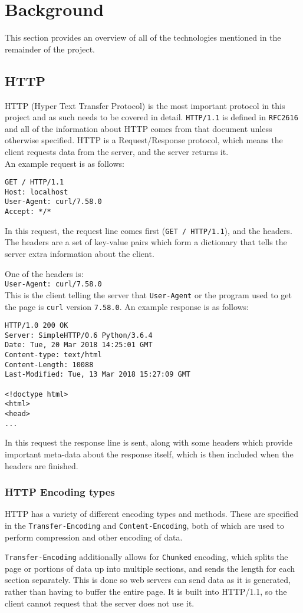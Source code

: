 \section{Background}
This section provides an overview of all of the technologies mentioned in the remainder of the project.
\subsection{HTTP}
HTTP (Hyper Text Transfer Protocol) is the most important protocol in this project and as such needs to be covered in detail.
\texttt{HTTP/1.1} is defined in \texttt{RFC2616}\cite{rfc2616} and all of the information about HTTP comes from that document unless otherwise specified.
HTTP is a Request/Response protocol, which means the client requests data from the server, and the server returns it.\\
An example request is as follows:
\begin{verbatim}
GET / HTTP/1.1
Host: localhost
User-Agent: curl/7.58.0
Accept: */*
\end{verbatim}
In this request, the request line comes first (\texttt{GET / HTTP/1.1}), and the headers. The headers are a set of key-value pairs which form a dictionary that tells the server extra information about the client.

One of the headers is:\\
\texttt{User-Agent: curl/7.58.0}\\
This is the client telling the server that \texttt{User-Agent} or the program used to get the page is \texttt{curl} version \texttt{7.58.0}.\vspace{0.4cm}\newline
An example response is as follows:
\begin{verbatim}
HTTP/1.0 200 OK
Server: SimpleHTTP/0.6 Python/3.6.4
Date: Tue, 20 Mar 2018 14:25:01 GMT
Content-type: text/html
Content-Length: 10088
Last-Modified: Tue, 13 Mar 2018 15:27:09 GMT

<!doctype html>
<html>
<head>
...
\end{verbatim}
In this request the response line is sent, along with some headers which provide important meta-data about the response itself, which is then included when the headers are finished.

\subsubsection{HTTP Encoding types}
HTTP has a variety of different encoding types and methods.
These are specified in the \texttt{Transfer-Encoding} and \texttt{Content-Encoding}, both of which are  used to perform compression and other encoding of data.\par
\texttt{Transfer-Encoding} additionally allows for \texttt{Chunked} encoding\cite{rfc7230}, which splits the page or portions of data up into multiple sections, and sends the length for each section separately. This is done so web servers can send data as it is generated, rather than having to buffer the entire page. It is built into HTTP/1.1, so the client cannot request that the server does not use it.

